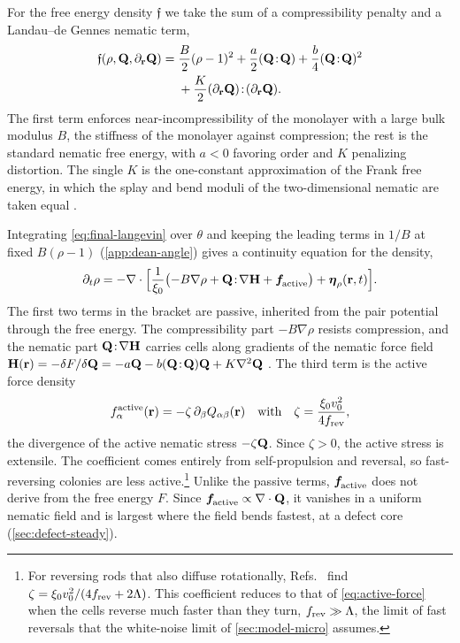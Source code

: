 \documentclass[aps,pre,reprint,superscriptaddress,longbibliography,nofootinbib
]{revtex4-2}
\begin{document}
For the free energy density $\mathfrak f$ we take the sum
of a compressibility penalty and a Landau--de Gennes
nematic term,
\begin{align}
    \label{eq:free-energy-choice}
    \mathfrak f(\rho,\mathbf{Q},\partial_{\mathbf{r}}\mathbf{Q}) = {}& \frac B2(\rho-1)^2 + \frac a2(\mathbf{Q}\!:\!\mathbf{Q})
    + \frac b4(\mathbf{Q}\!:\!\mathbf{Q})^2
    \nonumber\\
    &+ \frac K2(\partial_{\mathbf{r}}\mathbf{Q})\!:\!(\partial_{\mathbf{r}}\mathbf{Q}).
\end{align}
The first term enforces near-incompressibility of the
monolayer with a large bulk modulus $B$, the stiffness of
the monolayer against compression; the rest is the
standard nematic free energy, with $a<0$ favoring order and
$K$ penalizing distortion. The single $K$ is the
one-constant approximation of the Frank free energy, in
which the splay and bend moduli of the two-dimensional
nematic are taken equal
\cite{degennes1993physics,frank1958liquid}.


Integrating \cref{eq:final-langevin} over $\theta$ and
keeping the leading terms in $1/B$ at fixed $B(\rho-1)$
(\cref{app:dean-angle}) gives a continuity equation for the
density,
\begin{align}
  \label{eq:model-rho}
  \partial_t\rho = -\nabla\cdot\Bigl[
    \frac1{\xi_0}\bigl(-B\nabla\rho + \mathbf{Q}\!:\!\nabla\mathbf{H} + \boldsymbol{f}_\text{\!active}\bigr)
    + \boldsymbol\eta_{\rho}(\mathbf{r},t)\Bigr].
\end{align}
The first two terms in the bracket are passive, inherited
from the pair potential through the free energy. The
compressibility part $-B\nabla\rho$ resists compression,
and the nematic part $\mathbf{Q}\!:\!\nabla\mathbf{H}$ carries cells along
gradients of the nematic force field $\mathbf{H}(\mathbf{r})=-\delta
F/\delta\mathbf{Q}= -a\mathbf{Q} - b(\mathbf{Q}\!:\!\mathbf{Q})\mathbf{Q} + K\nabla^2\mathbf{Q}$
\cite{degennes1993physics}. The third term is the active
force density
\begin{align}
  \label{eq:active-force}
 {f}^\text{active}_\alpha(\mathbf{r}) = -\zeta\,\partial_\beta Q_{\alpha\beta}(\mathbf{r})
  \quad\text{with}\quad
  \zeta = \frac{\xi_0v_0^2}{4f_{\rm rev}},
\end{align}
the divergence of the active nematic stress $-\zeta\mathbf{Q}$.
Since $\zeta>0$, the active stress is extensile. The
coefficient comes entirely from self-propulsion and
reversal, so fast-reversing colonies are less
active.\footnote{For reversing rods that also diffuse
rotationally,
Refs.~\cite{grossmann2016mesoscale,banerjee2026active} find
$\zeta={\xi_0v_0^2}/{(4f_{\rm rev}+2\Lambda)}$. This coefficient
reduces to that of \cref{eq:active-force} when the cells
reverse much faster than they turn, $f_{\rm rev}\gg\Lambda$, the
limit of fast reversals that the white-noise limit of
\cref{sec:model-micro} assumes.}
Unlike the passive terms, $\boldsymbol{f}_\text{\!active}$ does not derive from the
free energy $F$. Since $\boldsymbol{f}_\text{\!active}\propto\nabla\cdot\mathbf{Q}$, it
vanishes in a uniform nematic field and is largest where
the field bends fastest, at a defect core
(\cref{sec:defect-steady}).
\end{document}
